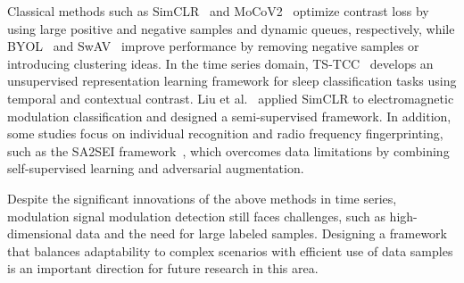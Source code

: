 Classical methods such as SimCLR~\cite{chen2020simple} and MoCoV2~\cite{chen2020improved} optimize contrast loss by using large positive and negative samples and dynamic queues, respectively, while BYOL~\cite{grill2020bootstrap} and SwAV~\cite{zhu2020swav} improve performance by removing negative samples or introducing clustering ideas. In the time series domain, TS-TCC~\cite{eldele2021time} develops an unsupervised representation learning framework for sleep classification tasks using temporal and contextual contrast. Liu et al.~\cite{liu2021self} applied SimCLR to electromagnetic modulation classification and designed a semi-supervised framework. In addition, some studies focus on individual recognition and radio frequency fingerprinting, such as the SA2SEI framework~\cite{liu2023overcoming}, which overcomes data limitations by combining self-supervised learning and adversarial augmentation.

Despite the significant innovations of the above methods in time series, modulation signal modulation detection still faces challenges, such as high-dimensional data and the need for large labeled samples. Designing a framework that balances adaptability to complex scenarios with efficient use of data samples is an important direction for future research in this area.